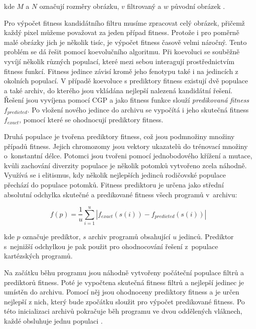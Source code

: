 \documentclass[fleqn,11pt]{ExcelAtFIT} %
\begin{document}
\noindent{}kde $M$ a $N$ označují rozměry obrázku, $v$ filtrovaný a $w$ původní obrázek \cite{ZelenaIF}.

Pro výpočet fitness kandidátního filtru musíme zpracovat celý obrázek, přičemž každý pixel můžeme považovat za jeden případ fitness. Protože i pro poměrně malé obrázky jich je několik tisíc, je výpočet fitness časově velmi náročný. Tento problém se dá řešit pomocí koevolučního algoritmu. Při koevoluci se souběžně vyvíjí několik různých populací, které mezi sebou interagují prostřednictvím fitness funkcí. Fitness jedince závisí kromě jeho fenotypu také i na jedincích z okolních populací. V případě koevoluce s prediktory fitness existují dvě populace a také archiv, do kterého jsou vkládána nejlepší nalezená kandidátní řešení. Řešení jsou vyvíjena pomocí CGP a jako fitness funkce slouží \textit{predikovaná fitness} $f_{\mathit{predicted}}$. Po vložení nového jedince do archivu se vypočítá i jeho skutečná fitness $f_{\mathit{exact}}$, pomocí které se ohodnocují prediktory fitness.

Druhá populace je tvořena prediktory fitness, což jsou podmnožiny množiny případů fitness. Jejich chromozomy jsou vektory ukazatelů do trénovací množiny o~konstantní délce. Potomci jsou tvořeni pomocí jednobodového křížení a mutace, kvůli zachování diverzity populace je několik potomků vytvořeno zcela náhodně. Využívá se i elitismus, kdy několik nejlepších jedinců rodičovské populace přechází do populace potomků. Fitness prediktoru je určena jako střední absolutní odchylka skutečné a predikované fitness všech programů v~archivu:

\begin{equation}
    \label{eq:fitnessPredictor}
    f \left( p \right) = \frac{1}{u} \sum\limits_{i=1}^{u} \left| f_{\mathit{exact}} \left( s \left( i \right) \right) - f_{\mathit{predicted}} \left( s \left( i \right) \right) \right|
\end{equation}

\noindent{}kde $p$ označuje prediktor, $s$ archiv programů obsahující $u$ jedinců. Prediktor s~nejnižší odchylkou je pak použit pro ohodnocování řešení z~populace kartézských programů.

Na začátku běhu programu jsou náhodně vytvořeny počáteční populace filtrů a prediktorů fitness. Poté je vypočtena skutečná fitness filtrů a nejlepší jedinec je umístěn do archivu. Pomocí něj jsou ohodnoceny prediktory fitness a je určen nejlepší z nich, který bude zpočátku sloužit pro výpočet predikované fitness. Po této inicializaci archivů pokračuje běh programu ve dvou oddělených vláknech, každé obsluhuje jednu populaci \cite{SikuPPSN}.
\end{document}
